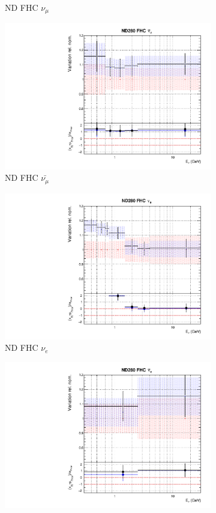 \begin{figure}
\begin{subfigure}{0.45\textwidth}
  \caption{ND FHC $\nu_{\mu}$}
\end{subfigure}
\begin{subfigure}{0.45\textwidth}
  \centering
  \includegraphics[width=0.75\linewidth]{figs/fixed2p2hflux1}
  \caption{ND FHC $\bar{\nu_{\mu}}$}
\end{subfigure}
\begin{subfigure}{0.45\textwidth}
  \centering
  \includegraphics[width=0.75\linewidth]{figs/fixed2p2hflux2}
  \caption{ND FHC $\nu_{e}$}
\end{subfigure}
\begin{subfigure}{0.45\textwidth}
  \centering
  \includegraphics[width=0.75\linewidth]{figs/fixed2p2hflux3}

\end{subfigure}
\end{figure}
